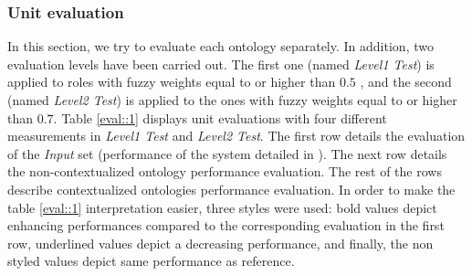 		\subsubsection{Unit evaluation}
		In this section, we try to evaluate each ontology separately. In addition, two
		evaluation levels have been carried out. The first one (named \emph{Level1 Test}) is applied to roles with 
		fuzzy weights equal to or higher than $0.5$ , and the second (named \emph{Level2 Test}) is applied to 
		the ones with fuzzy weights equal to or higher than $0.7$. 
		Table \ref{eval::1} displays unit evaluations with four different measurements in 
		\emph{Level1 Test} and \emph{Level2 Test}.
		The first row details the evaluation of the \emph{Input} set (performance of the system detailed in 
		\cite{Ksibi2012}). The next row details the non-contextualized ontology performance evaluation. 
		The rest of the rows describe contextualized ontologies performance evaluation.
		In order to make the table \ref{eval::1} interpretation easier, three styles were used:
		bold values depict enhancing performances compared to the corresponding 
		evaluation in the first row, 
		underlined values depict a decreasing performance, and finally, the non styled values depict same performance 
		as reference. 

